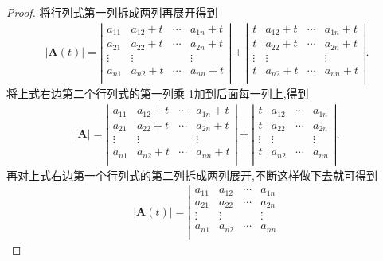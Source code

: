 \documentclass[lang=cn,newtx,10pt,scheme=chinese]{elegantbook}
\begin{document}
\begin{proof}
将行列式第一列拆成两列再展开得到
\begin{align*}
|\boldsymbol{A}(t)|=\left| \begin{matrix}
a_{11}&		a_{12}+t&		\cdots&		a_{1n}+t\\
a_{21}&		a_{22}+t&		\cdots&		a_{2n}+t\\
\vdots&		\vdots&		&		\vdots\\
a_{n1}&		a_{n2}+t&		\cdots&		a_{nn}+t\\
\end{matrix} \right|+\left| \begin{matrix}
t&		a_{12}+t&		\cdots&		a_{1n}+t\\
t&		a_{22}+t&		\cdots&		a_{2n}+t\\
\vdots&		\vdots&		&		\vdots\\
t&		a_{n2}+t&		\cdots&		a_{nn}+t\\
\end{matrix} \right|.
\nonumber
\end{align*}
将上式右边第二个行列式的第一列乘-1加到后面每一列上,得到
\begin{align*}
\left| \boldsymbol{A} \right|=\left| \begin{matrix}
a_{11}&		a_{12}+t&		\cdots&		a_{1n}+t\\
a_{21}&		a_{22}+t&		\cdots&		a_{2n}+t\\
\vdots&		\vdots&		&		\vdots\\
a_{n1}&		a_{n2}+t&		\cdots&		a_{nn}+t\\
\end{matrix} \right|+\left| \begin{matrix}
t&		a_{12}&		\cdots&		a_{1n}\\
t&		a_{22}&		\cdots&		a_{2n}\\
\vdots&		\vdots&		&		\vdots\\
t&		a_{n2}&		\cdots&		a_{nn}\\
\end{matrix} \right| .
\nonumber
\end{align*}
再对上式右边第一个行列式的第二列拆成两列展开,不断这样做下去就可得到
\begin{gather*}
|\boldsymbol{A}(t)|=\left| \begin{matrix}
a_{11}&		a_{12}&		\cdots&		a_{1n}\\
a_{21}&		a_{22}&		\cdots&		a_{2n}\\
\vdots&		\vdots&		&		\vdots\\
a_{n1}&		a_{n2}&		\cdots&		a_{nn}\\

\end{matrix}
\end{gather*}
\end{proof}
\end{document}

